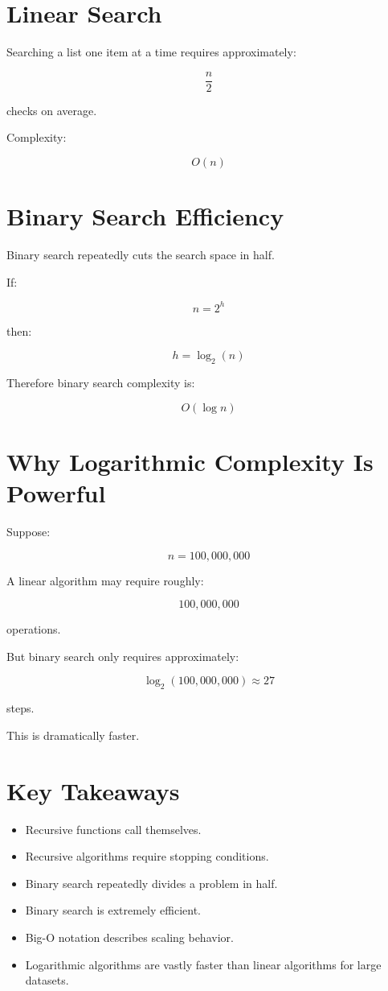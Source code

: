 \documentclass[11pt]{article}
\begin{document}
\section{Linear Search}

Searching a list one item at a time requires approximately:

\[
\frac{n}{2}
\]

checks on average.

Complexity:

\[
O(n)
\]

\section{Binary Search Efficiency}

Binary search repeatedly cuts the search space in half.

If:

\[
n = 2^h
\]

then:

\[
h = \log_2(n)
\]

Therefore binary search complexity is:

\[
O(\log n)
\]

\section{Why Logarithmic Complexity Is Powerful}

Suppose:

\[
n = 100,000,000
\]

A linear algorithm may require roughly:

\[
100,000,000
\]

operations.

But binary search only requires approximately:

\[
\log_2(100,000,000) \approx 27
\]

steps.

This is dramatically faster.

\section{Key Takeaways}

\begin{itemize}
    \item Recursive functions call themselves.
    \item Recursive algorithms require stopping conditions.
    \item Binary search repeatedly divides a problem in half.
    \item Binary search is extremely efficient.
    \item Big-O notation describes scaling behavior.
    \item Logarithmic algorithms are vastly faster than linear algorithms for large datasets.
\end{itemize}
\end{document}
